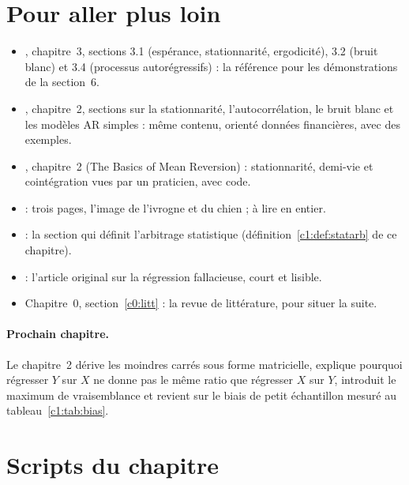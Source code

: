 \section{Pour aller plus loin}

\begin{toread}
\begin{itemize}[leftmargin=1.2em]
\item \citet{hamilton1994}, chapitre~3, sections 3.1 (espérance, stationnarité, ergodicité), 3.2 (bruit blanc) et 3.4 (processus autorégressifs) : la référence pour les démonstrations de la section~6.
\item \citet{tsay2010}, chapitre~2, sections sur la stationnarité, l'autocorrélation, le bruit blanc et les modèles AR simples : même contenu, orienté données financières, avec des exemples.
\item \citet{chan2013}, chapitre~2 (\og The Basics of Mean Reversion\fg) : stationnarité, demi-vie et cointégration vues par un praticien, avec code.
\item \citet{murray1994} : trois pages, l'image de l'ivrogne et du chien ; à lire en entier.
\item \citet{hogan2004} : la section qui définit l'arbitrage statistique (définition~\ref{c1:def:statarb} de ce chapitre).
\item \citet{granger1974} : l'article original sur la régression fallacieuse, court et lisible.
\item Chapitre~0, section~\ref{c0:litt} : la revue de littérature, pour situer la suite.
\end{itemize}
\end{toread}

\paragraph{Prochain chapitre.} Le chapitre~2 dérive les moindres carrés sous forme matricielle, explique pourquoi régresser $Y$ sur $X$ ne donne pas le même ratio que régresser $X$ sur $Y$, introduit le maximum de vraisemblance et revient sur le biais de petit échantillon mesuré au tableau~\ref{c1:tab:bias}.

\section{Scripts du chapitre}

